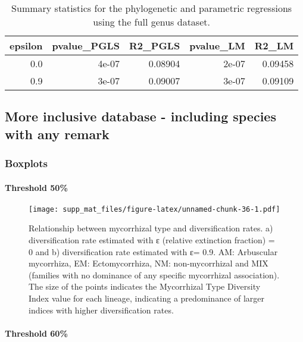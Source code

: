 \documentclass[]{article}
\let\oldparagraph\paragraph
\renewcommand{\paragraph}[1]{\oldparagraph{#1}\mbox{}}
\begin{document}
\begin{longtable}{r|r|r|r|r}
\caption{\label{tab:unnamed-chunk-34}Summary statistics for the phylogenetic and parametric regressions using the full genus dataset.}\\
\hline
epsilon & pvalue\_PGLS & R2\_PGLS & pvalue\_LM & R2\_LM\\
\hline
0.0 & 4e-07 & 0.08904 & 2e-07 & 0.09458\\
\hline
0.9 & 3e-07 & 0.09007 & 3e-07 & 0.09109\\
\hline
\end{longtable}

\hypertarget{more-inclusive-database---including-species-with-any-remark}{%
\subsection{More inclusive database - including species with any
remark}\label{more-inclusive-database---including-species-with-any-remark}}

\hypertarget{boxplots-3}{%
\subsubsection{Boxplots}\label{boxplots-3}}

\hypertarget{threshold-50-3}{%
\paragraph{Threshold 50\%}\label{threshold-50-3}}

\begin{figure}
\centering
\texttt{[image: supp\_mat\_files/figure-latex/unnamed-chunk-36-1.pdf]}
\caption{Relationship between mycorrhizal type and diversification
rates. a) diversification rate estimated with ε (relative extinction
fraction) = 0 and b) diversification rate estimated with ε= 0.9. AM:
Arbuscular mycorrhiza, EM: Ectomycorrhiza, NM: non-mycorrhizal and MIX
(families with no dominance of any specific mycorrhizal association).
The size of the points indicates the Mycorrhizal Type Diversity Index
value for each lineage, indicating a predominance of larger indices with
higher diversification rates.}
\end{figure}

\hypertarget{threshold-60-3}{%
\paragraph{Threshold 60\%}\label{threshold-60-3}}
\end{document}
